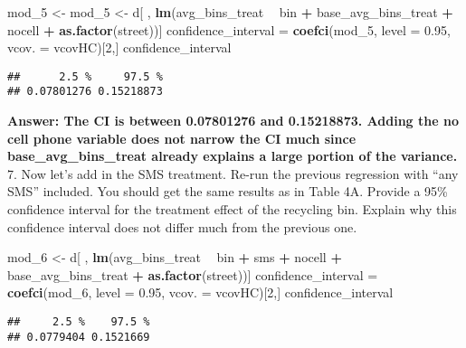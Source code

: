 \documentclass[
]{article}
\newenvironment{Shaded}{\begin{snugshade}}{\end{snugshade}}
\newcommand{\DataTypeTok}[1]{\textcolor[rgb]{0.13,0.29,0.53}{#1}}
\newcommand{\DecValTok}[1]{\textcolor[rgb]{0.00,0.00,0.81}{#1}}
\newcommand{\FloatTok}[1]{\textcolor[rgb]{0.00,0.00,0.81}{#1}}
\newcommand{\KeywordTok}[1]{\textcolor[rgb]{0.13,0.29,0.53}{\textbf{#1}}}
\newcommand{\NormalTok}[1]{#1}
\newcommand{\OperatorTok}[1]{\textcolor[rgb]{0.81,0.36,0.00}{\textbf{#1}}}
\newcommand{\StringTok}[1]{\textcolor[rgb]{0.31,0.60,0.02}{#1}}
\begin{document}
\begin{Shaded}
\begin{Highlighting}[]
\NormalTok{mod_}\DecValTok{5}\NormalTok{ <-}\StringTok{ }\NormalTok{mod_}\DecValTok{5}\NormalTok{ <-}\StringTok{ }\NormalTok{d[ , }\KeywordTok{lm}\NormalTok{(avg_bins_treat }\OperatorTok{~}\StringTok{ }\NormalTok{bin }\OperatorTok{+}\StringTok{ }\NormalTok{base_avg_bins_treat }\OperatorTok{+}
\NormalTok{nocell }\OperatorTok{+}\StringTok{ }\KeywordTok{as.factor}\NormalTok{(street))]}
\NormalTok{confidence_interval =}\StringTok{ }\KeywordTok{coefci}\NormalTok{(mod_}\DecValTok{5}\NormalTok{, }\DataTypeTok{level =} \FloatTok{0.95}\NormalTok{, }\DataTypeTok{vcov. =}\NormalTok{ vcovHC)[}\DecValTok{2}\NormalTok{,] }
\NormalTok{confidence_interval}
\end{Highlighting}
\end{Shaded}

\begin{verbatim}
##      2.5 %     97.5 % 
## 0.07801276 0.15218873
\end{verbatim}

\textbf{Answer: The CI is between 0.07801276 and 0.15218873. Adding the
no cell phone variable does not narrow the CI much since
base\_avg\_bins\_treat already explains a large portion of the
variance.} 7. Now let's add in the SMS treatment. Re-run the previous
regression with ``any SMS'' included. You should get the same results as
in Table 4A. Provide a 95\% confidence interval for the treatment effect
of the recycling bin. Explain why this confidence interval does not
differ much from the previous one.

\begin{Shaded}
\begin{Highlighting}[]
\NormalTok{mod_}\DecValTok{6}\NormalTok{ <-}\StringTok{ }\NormalTok{d[ , }\KeywordTok{lm}\NormalTok{(avg_bins_treat }\OperatorTok{~}\StringTok{ }\NormalTok{bin }\OperatorTok{+}\StringTok{ }\NormalTok{sms }\OperatorTok{+}\StringTok{ }\NormalTok{nocell }\OperatorTok{+}
\NormalTok{base_avg_bins_treat }\OperatorTok{+}\StringTok{ }\KeywordTok{as.factor}\NormalTok{(street))]}
\NormalTok{confidence_interval =}\StringTok{ }\KeywordTok{coefci}\NormalTok{(mod_}\DecValTok{6}\NormalTok{, }\DataTypeTok{level =} \FloatTok{0.95}\NormalTok{, }\DataTypeTok{vcov. =}\NormalTok{ vcovHC)[}\DecValTok{2}\NormalTok{,] }
\NormalTok{confidence_interval}
\end{Highlighting}
\end{Shaded}

\begin{verbatim}
##     2.5 %    97.5 % 
## 0.0779404 0.1521669
\end{verbatim}
\end{document}

